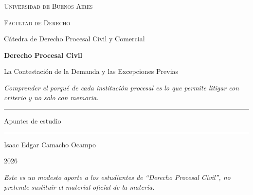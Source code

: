 \documentclass[12pt,oneside]{book}
\newcommand{\universidad}{Universidad de Buenos Aires}
\newcommand{\facultad}{Facultad de Derecho}
\newcommand{\catedra}{Cátedra de Derecho Procesal Civil y Comercial}
\newcommand{\materia}{Derecho Procesal Civil}
\newcommand{\titulo}{La Contestación de la Demanda y las Excepciones Previas}
\newcommand{\autor}{Isaac Edgar Camacho Ocampo}
\newcommand{\anio}{2026}
\begin{document}
\begin{titlepage}
\thispagestyle{empty}

\begin{center}

\vspace*{1cm}

{\large \textsc{\universidad}}

\vspace{0.2cm}

{\large \textsc{\facultad}}

\vspace{0.2cm}

{\large \catedra}

\vspace{3cm}

{\Huge \textbf{\materia}}

\vspace{1cm}

{\LARGE \titulo}

\vspace{0.8cm}

\textit{Comprender el porqué de cada institución procesal es lo que permite litigar con criterio y no solo con memoria.}

\vspace{1.2cm}

\rule{0.70\textwidth}{0.5pt}

\vspace{0.5cm}

{\large Apuntes de estudio}

\vspace{0.5cm}

\rule{0.70\textwidth}{0.5pt}

\vfill

{\large \autor}

\vspace{0.3cm}

{\large \anio}

\end{center}

\vfill

\begin{flushleft}
\textit{Este es un modesto aporte a los estudiantes de ``Derecho Procesal Civil'', no pretende sustituir el material oficial de la materia.}
\end{flushleft}

\end{titlepage}
\end{document}
